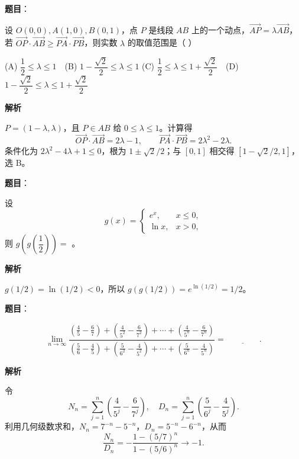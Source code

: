 \begin{answer}

\textbf{题目}：

设 $O(0,0),A(1,0),B(0,1)$，点 $P$ 是线段 $AB$ 上的一个动点，$\overrightarrow{AP}=\lambda\overrightarrow{AB}$，若 $\overrightarrow{OP}\cdot\overrightarrow{AB}\geq\overrightarrow{PA}\cdot\overrightarrow{PB}$，则实数 $\lambda$ 的取值范围是（ ）

(A) $\dfrac12\leq\lambda\leq1$　(B) $1-\dfrac{\sqrt2}{2}\leq\lambda\leq1$
(C) $\dfrac12\leq\lambda\leq1+\dfrac{\sqrt2}{2}$　(D) $1-\dfrac{\sqrt2}{2}\leq\lambda\leq1+\dfrac{\sqrt2}{2}$

\textbf{解析}

$P=(1-\lambda,\lambda)$，且 $P\in AB$ 给 $0\le\lambda\le1$。计算得
\nopagebreak[4]
\[
\overrightarrow{OP}\cdot\overrightarrow{AB}=2\lambda-1,\qquad
\overrightarrow{PA}\cdot\overrightarrow{PB}=2\lambda^2-2\lambda.
\]
条件化为 $2\lambda^2-4\lambda+1\le0$，根为 $1\pm\sqrt2/2$；与 $[0,1]$ 相交得 $[1-\sqrt2/2,1]$，选 B。


\end{answer}
\begin{answer}

\textbf{题目}：

设
\nopagebreak[4]
\[
g(x)=\begin{cases}e^x,&x\leq0,\\\ln x,&x>0,\end{cases}
\]
则 $g\left(g\left(\dfrac12\right)\right)=$ \gkblank{}。

\textbf{解析}

$g(1/2)=\ln(1/2)<0$，所以 $g(g(1/2))=e^{\ln(1/2)}=1/2$。


\end{answer}
\begin{answer}

\textbf{题目}：

\nopagebreak[4]
\[
\lim_{n\to\infty}\frac{\left(\frac45-\frac67\right)+\left(\frac{4}{5^2}-\frac{6}{7^2}\right)+\cdots+\left(\frac{4}{5^n}-\frac{6}{7^n}\right)}{\left(\frac56-\frac45\right)+\left(\frac{5}{6^2}-\frac{4}{5^2}\right)+\cdots+\left(\frac{5}{6^n}-\frac{4}{5^n}\right)}=\underline{\qquad\qquad}.
\]

\textbf{解析}

令
\nopagebreak[4]
\[
N_n=\sum_{j=1}^n\left(\frac4{5^j}-\frac6{7^j}\right),\quad
D_n=\sum_{j=1}^n\left(\frac5{6^j}-\frac4{5^j}\right).
\]
利用几何级数求和，$N_n=7^{-n}-5^{-n}$，$D_n=5^{-n}-6^{-n}$，从而
\nopagebreak[4]
\[
\frac{N_n}{D_n}=-\frac{1-(5/7)^n}{1-(5/6)^n}\longrightarrow -1.
\]


\end{answer}
